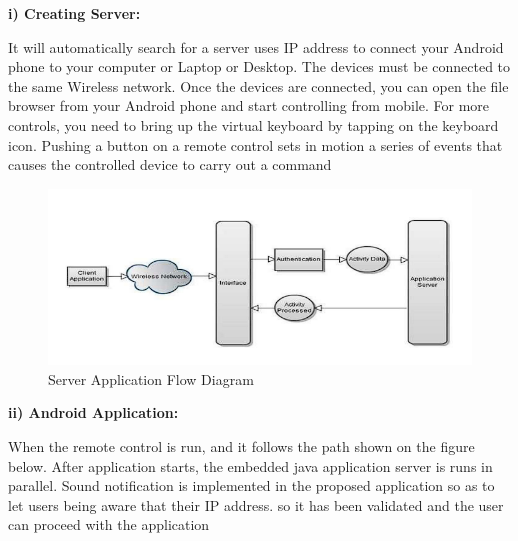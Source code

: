 \documentclass[12pt]{article}
\begin{document}
\clearpage
 
\textbf{  i) Creating Server:}\\[2mm]\par
It will automatically search for a server uses IP address to connect your Android
phone to your computer or Laptop or Desktop. The devices must be connected to
the same Wireless network. Once the devices are connected, you can open the file
browser from your Android phone and start controlling from mobile. For more
controls, you need to bring up the virtual keyboard by tapping on the keyboard
icon. Pushing a button on a remote control sets in motion a series of events that
causes the controlled device to carry out a command\par 
\begin{figure}[h]
 \centering
 \includegraphics[scale=.5]{Methodology2}
  \caption{Server Application Flow Diagram}
 \end{figure}

\textbf{  ii) Android Application:}\\[2mm]\par 
When the remote control is run, and it follows the path shown on the figure
below. After application starts, the embedded java application server is runs in
parallel. Sound notification is implemented in the proposed application so as to let
users being aware that their IP address. so it has been validated and the user can
proceed with the application\par
 
\end{document}
